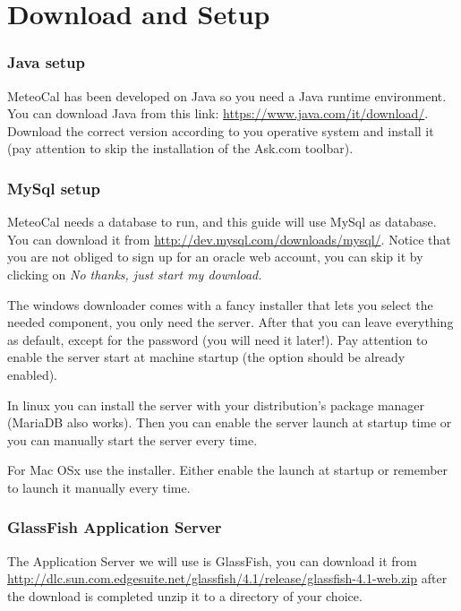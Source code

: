 \documentclass[10pt,a4paper,titlepage]{article}
\begin{document}


\tableofcontents

\part{Download and Setup}

\section{Java setup}
MeteoCal has been developed on Java so you need a Java runtime environment. You can download Java from this link: \url{https://www.java.com/it/download/}. Download the correct version according to you operative system and install it (pay attention to skip the installation of the Ask.com toolbar).

\section{MySql setup}
MeteoCal needs a database to run, and this guide will use MySql as database. You can download it from \url{http://dev.mysql.com/downloads/mysql/}. Notice that you are not obliged to sign up for an oracle web account, you can skip it by clicking on \emph{No thanks, just start my download.}

The windows downloader comes with a fancy installer that lets you select the needed component, you only need the server. After that you can leave everything as default, except for the password (you will need it later!). Pay attention to enable the server start at machine startup (the option should be already enabled).

In linux you can install the server with your distribution's package manager (MariaDB also works). Then you can enable the server launch at startup time or you can manually start the server every time.

For Mac OSx use the installer. Either enable the launch at startup or remember to launch it manually every time.
 
\section{GlassFish Application Server}
The Application Server we will use is GlassFish, you can download it from \url{http://dlc.sun.com.edgesuite.net/glassfish/4.1/release/glassfish-4.1-web.zip} after the download is completed unzip it to a directory of your choice.
\end{document}

